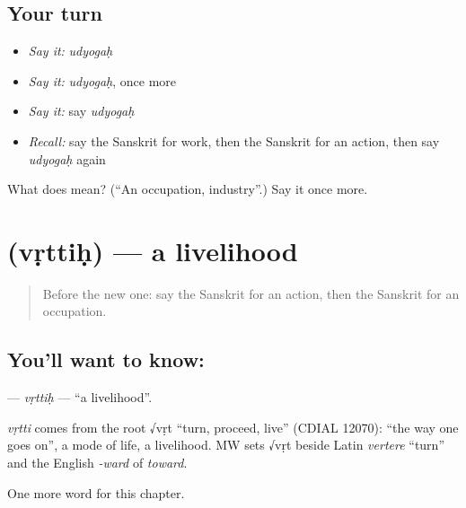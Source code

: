 \subsection*{Your turn}
\begin{itemize}
\raggedright
  \item \emph{Say it:} \emph{udyogaḥ}
  \item \emph{Say it:} \emph{udyogaḥ}, once more
  \item \emph{Say it:} say \emph{udyogaḥ}
  \item \emph{Recall:} say the Sanskrit for work, then the Sanskrit for an action, then say \emph{udyogaḥ} again
\end{itemize}

\begin{tcolorbox}[breakable,colback=teal!4,colframe=teal!35!black,title={Before you move on}]
What does  mean? (\textquotedblleft{}An occupation, industry\textquotedblright{}.) Say it once more.
\end{tcolorbox}
\section[\texorpdfstring{\sk{वृत्तिः} (vṛttiḥ)}{वृत्तिः (vṛttiḥ)}]{ (vṛttiḥ) — a livelihood}

\label{lesson:SA-C170-vrttih}



\begin{quote}
Before the new one: say the Sanskrit for an action, then the Sanskrit for an occupation.
\end{quote}

\subsection*{You'll want to know: }
\textbf{} — \emph{vṛttiḥ} — \textquotedblleft{}a livelihood\textquotedblright{}.

\begin{cousinweb}
\emph{vṛtti} comes from the root √vṛt \textquotedblleft{}turn, proceed, live\textquotedblright{} (CDIAL 12070): \textquotedblleft{}the way one goes on\textquotedblright{}, a mode of life, a livelihood. MW sets √vṛt beside Latin \emph{vertere} \textquotedblleft{}turn\textquotedblright{} and the English \emph{-ward} of \emph{toward}.
\end{cousinweb}

\begin{grammarlens}[title={What you've built}]
One more word for this chapter.
\end{grammarlens}

